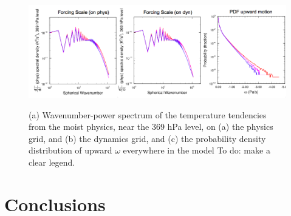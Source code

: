 \documentclass{agujournal}
\begin{document}
\begin{figure}[t]
\begin{center}
\noindent\includegraphics[width=30pc,angle=0]{figs/loworder-panel.png}\\
\end{center}
\caption{(a) Wavenumber-power spectrum of the temperature tendencies from the moist physics, near the 369 hPa level, on (a) the physics grid, and (b) the dynamics grid, and (c) the probability density distribution of upward $\omega$ everywhere in the model {\color{red}To do: make a clear legend.}}
\label{fig:loworder}
\end{figure}


\section{Conclusions}




\end{document}
